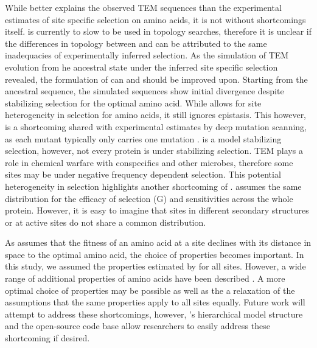 While \selac better explains the observed TEM sequences than the experimental estimates of site specific selection on amino acids, it is not without shortcomings itself.
\selac is currently to slow to be used in topology searches, therefore it is unclear if the differences in topology between \phydms and \selac can be attributed to the same inadequacies of experimentally inferred selection.
As the simulation of TEM evolution from he ancestral state under the \selac inferred site specific selection revealed, the formulation of \selac can and should be improved upon.
Starting from the ancestral sequence, the simulated sequences show initial divergence despite stabilizing selection for the optimal amino acid.
While \selac allows for site heterogeneity in selection for amino acids, it still ignores epistasis.
This however, is a shortcoming shared with experimental estimates by deep mutation scanning, as each mutant typically only carries one mutation \citep{FirnbergAndOstermeier2012, Jain2014}.
\selac is a model stabilizing selection, however, not every protein is under stabilizing selection.
TEM plays a role in chemical warfare with conspecifics and other microbes, therefore some sites may be under negative frequency dependent selection.
This potential heterogeneity in selection highlights another shortcoming of \selac.
\selac assumes the same distribution for the efficacy of selection (G) and \PC sensitivities across the whole protein.
However, it is easy to imagine that sites in different secondary structures or at active sites do not share a common distribution.


As \selac assumes that the fitness of an amino acid at a site declines with its distance in \PC space to the optimal amino acid, the choice of \PC properties becomes important.
In this study, we assumed the \PC properties estimated by \citet{grantham1974} for all sites.
However, a wide range of additional \PC properties of amino acids have been described \citep{Kawashima2008}.
A more optimal choice of \PC properties may be possible as well as the a relaxation of the assumptions that the same properties apply to all sites equally.
Future work will attempt to address these shortcomings, however, \selac's hierarchical model structure and the open-source code base allow researchers to easily address these shortcoming if desired.

